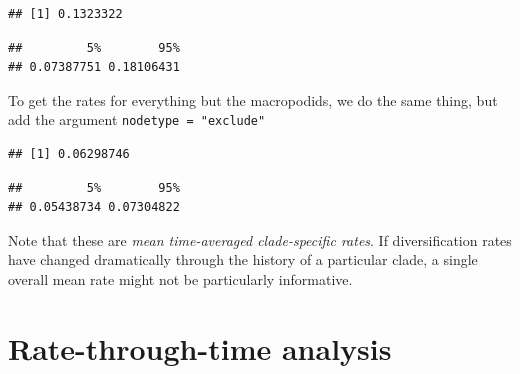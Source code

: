 \documentclass[]{book}
\newenvironment{Shaded}{\begin{snugshade}}{\end{snugshade}}
\newcommand{\KeywordTok}[1]{\textcolor[rgb]{0.13,0.29,0.53}{\textbf{{#1}}}}
\newcommand{\DataTypeTok}[1]{\textcolor[rgb]{0.13,0.29,0.53}{{#1}}}
\newcommand{\DecValTok}[1]{\textcolor[rgb]{0.00,0.00,0.81}{{#1}}}
\newcommand{\FloatTok}[1]{\textcolor[rgb]{0.00,0.00,0.81}{{#1}}}
\newcommand{\StringTok}[1]{\textcolor[rgb]{0.31,0.60,0.02}{{#1}}}
\newcommand{\NormalTok}[1]{{#1}}
\theoremstyle{definition}
\theoremstyle{definition}
\theoremstyle{definition}
\theoremstyle{remark}
\begin{document}
\begin{verbatim}
## [1] 0.1323322
\end{verbatim}

\begin{Shaded}
\end{Shaded}

\begin{verbatim}
##         5%        95% 
## 0.07387751 0.18106431
\end{verbatim}

To get the rates for everything but the macropodids, we do the same
thing, but add the argument \texttt{nodetype\ =\ "exclude"}

\begin{Shaded}
\end{Shaded}

\begin{verbatim}
## [1] 0.06298746
\end{verbatim}

\begin{Shaded}
\end{Shaded}

\begin{verbatim}
##         5%        95% 
## 0.05438734 0.07304822
\end{verbatim}

Note that these are \emph{mean time-averaged clade-specific rates}. If
diversification rates have changed dramatically through the history of a
particular clade, a single overall mean rate might not be particularly
informative.

\section{Rate-through-time analysis}\label{rate-through-time-analysis}
\end{document}
